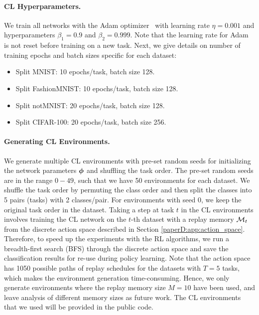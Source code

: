 \vspace{-3mm}
\paragraph{CL Hyperparameters.} We train all networks with the Adam optimizer~ with learning rate $\eta = 0.001$ and hyperparameters $\beta_1 = 0.9$ and $\beta_2 = 0.999$. Note that the learning rate for Adam is not reset before training on a new task. Next, we give details on number of training epochs and batch sizes specific for each dataset:
\begin{itemize}[topsep=1pt,noitemsep]
    \item Split MNIST: 10 epochs/task, batch size 128.
    \item Split FashionMNIST: 10 epochs/task, batch size 128.
    \item Split notMNIST: 20 epochs/task, batch size 128.
    \item Split CIFAR-100: 20 epochs/task, batch size 256.
\end{itemize}

\vspace{-3mm}
\paragraph{Generating CL Environments.} We generate multiple CL environments with pre-set random seeds for initializing the network parameters ${\bm{\phi}}$ and shuffling the task order. The pre-set random seeds are in the range $0-49$, such that we have 50 environments for each dataset. We shuffle the task order by permuting the class order and then split the classes into 5 pairs (tasks) with 2 classes/pair. For environments with seed $0$, we keep the original task order in the dataset. 
Taking a step at task $t$ in the CL environments involves training the CL network on the $t$-th dataset with a replay memory ${\mathcal{M}}_t$ from the discrete action space described in Section \ref{paperD:app:action_space}. Therefore, to speed up the experiments with the RL algorithms, we run a breadth-first search (BFS) through the discrete action space and save the classification results for re-use during policy learning. Note that the action space has 1050 possible paths of replay schedules for the datasets with $T=5$ tasks, which makes the environment generation time-consuming. Hence, we only generate environments where the replay memory size $M=10$ have been used, and leave analysis of different memory sizes as future work. The CL environments that we used will be provided in the public code. 

